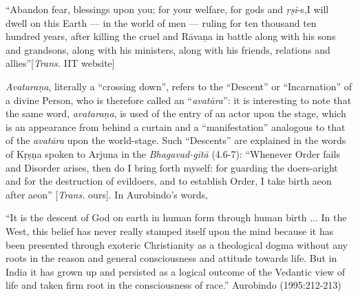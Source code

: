 \begin{myquote}
“Abandon fear, blessings upon you; for your welfare, for gods and {\sl ṛṣi}-s,\break I will dwell on this Earth --- in the world of men --- ruling for ten thousand ten hundred years, after killing the cruel and Rāvaṇa in battle along with his sons and grandsons, along with his ministers, along with his friends, relations and allies”\hfill [{\sl Trans.} IIT website]
\end{myquote}

{\sl Avataraṇa}, literally a “crossing down”, refers to the “Descent” or “Incarnation” of a divine Person, who is therefore called an “{\sl avatāra}”: it is interesting to note that the same word, {\sl avataraṇa}, is used of the entry of an actor upon the stage, which is an appearance from behind a curtain and a “manifestation” analogous to that of the {\sl avatāra} upon the world-stage. Such “Descents” are explained in the words of Kṛṣṇa spoken to Arjuna in the {\sl Bhagavad-gītā} (4.6-7): “Whenever Order fails and Disorder arises, then do I bring forth myself: for guarding the doers-aright and for the destruction of evildoers, and to establish Order, I take birth aeon after aeon” [{\sl Trans.} ours]. In Aurobindo’s words,  

\begin{myquote}
“It is the descent of God on earth in human form through human birth ... In the West, this belief has never really stamped itself upon the mind because it has been presented through exoteric Christianity as a theological dogma without any roots in the reason and general consciousness and attitude towards life. But in India it has grown up and persisted as a logical outcome of the Vedantic view of life and taken firm root in the consciousness of race.”	
\hfill Aurobindo (1995:212-213)
\end{myquote}

